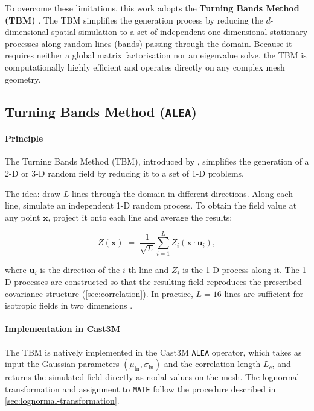 To overcome these limitations, this work adopts the \textbf{Turning Bands Method (TBM)} \cite{matheron1973, fenton2014}. The TBM simplifies the generation process by reducing the $d$-dimensional spatial simulation to a set of independent one-dimensional stationary processes along random lines (bands) passing through the domain. Because it requires neither a global matrix factorisation nor an eigenvalue solve, the TBM is computationally highly efficient and operates directly on any complex mesh geometry.


\subsection{Turning Bands Method (\texttt{ALEA})} \label{sec:tbm}
\paragraph{Principle}

The Turning Bands Method (TBM), introduced by \cite{matheron1973}, simplifies the generation of a 2-D or 3-D random field by reducing it to a set of 1-D problems.

The idea: draw $L$ lines through the domain in different directions. Along each line, simulate an independent 1-D random process. To obtain the field value at any point $\mathbf{x}$, project it onto each line and average the results:

\begin{equation}
    Z(\mathbf{x}) \;=\; \frac{1}{\sqrt{L}}
    \sum_{i=1}^{L}
    Z_i\!\left(\mathbf{x} \cdot \mathbf{u}_i\right),
    \label{eq:tbm}
\end{equation}

where $\mathbf{u}_i$ is the direction of the $i$-th line and $Z_i$ is the 1-D process along it. The 1-D processes are constructed so that the resulting field reproduces the prescribed covariance structure (\cref{sec:correlation}). In practice, $L = 16$ lines are sufficient for isotropic fields in two dimensions \cite{fenton2014}.

\paragraph{Implementation in Cast3M}

The TBM is natively implemented in the Cast3M \texttt{ALEA} operator, which takes as input the Gaussian parameters $(\mu_{\ln}, \sigma_{\ln})$ and the correlation length $L_c$, and returns the simulated field directly as nodal values on the mesh. The lognormal transformation and assignment to \texttt{MATE} follow the procedure described in \cref{sec:lognormal-transformation}.

